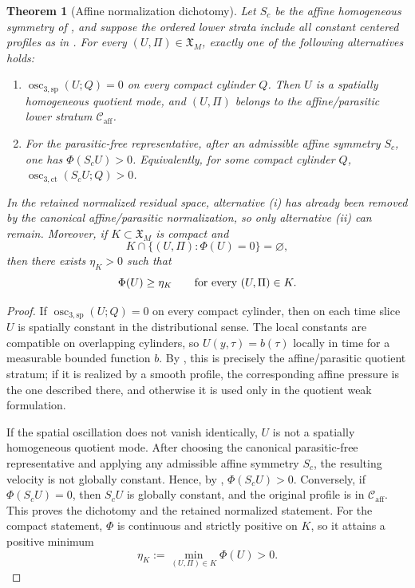 \documentclass[11pt]{amsart}
\numberwithin{equation}{section}
\theoremstyle{plain}
\newtheorem{theorem}{Theorem}[section]
\theoremstyle{definition}
\theoremstyle{remark}
\newcommand{\Caff}{\mathcal C_{\mathrm{aff}}}
\newcommand{\oscsp}{\operatorname{osc}_{3,\mathrm{sp}}}
\newcommand{\actthree}{\operatorname{osc}_{3,\mathrm{ct}}}
\begin{document}
\begin{theorem}[Affine normalization dichotomy]
\label{thm:affine-normalization-dichotomy}
Let \(S_c\) be the affine homogeneous symmetry of
, and suppose the ordered lower strata include all
constant centered profiles as in .
For every \((U,\Pi)\in\mathfrak X_M\), exactly one of the following alternatives
holds:
\begin{enumerate}[label=\textup{(\roman*)}]
   \item \(\oscsp(U;Q)=0\) on every compact cylinder \(Q\).  Then \(U\) is a
   spatially homogeneous quotient mode, and \((U,\Pi)\) belongs to the
   affine/parasitic lower stratum \(\Caff\).
   \item For the parasitic-free representative, after an admissible affine
   symmetry \(S_c\), one has \(\Phi(S_cU)>0\).  Equivalently, for some compact
   cylinder \(Q\), \(\actthree(S_cU;Q)>0\).
\end{enumerate}
In the retained normalized residual space, alternative \textup{(i)} has already
been removed by the canonical affine/parasitic normalization, so only
alternative \textup{(ii)} can remain.
Moreover, if \(K\subset\mathfrak X_M\) is compact and
\[
   K\cap\{(U,\Pi):\Phi(U)=0\}=\varnothing ,
\]
then there exists \(\eta_K>0\) such that
\[
   \Phi(U)\ge\eta_K
   \qquad\hbox{for every }(U,\Pi)\in K .
\]
\end{theorem}

\begin{proof}
If \(\oscsp(U;Q)=0\) on every compact cylinder, then on each time slice \(U\) is
spatially constant in the distributional sense.  The local constants are
compatible on overlapping cylinders, so \(U(y,\tau)=b(\tau)\) locally in time
for a measurable bounded function \(b\).  By
, this is precisely the
affine/parasitic quotient stratum; if it is realized by a smooth profile, the
corresponding affine pressure is the one described there, and otherwise it is
used only in the quotient weak formulation.

If the spatial oscillation does not vanish identically, \(U\) is not a
spatially homogeneous quotient mode.  After choosing the canonical
parasitic-free representative and applying any admissible affine symmetry
\(S_c\), the resulting velocity is not globally constant.  Hence, by
, \(\Phi(S_cU)>0\).  Conversely,
if \(\Phi(S_cU)=0\), then \(S_cU\) is globally constant, and the original
profile is in \(\Caff\).  This proves the dichotomy and the retained normalized
statement.  For the compact statement, \(\Phi\) is continuous and
strictly positive on \(K\), so it attains a positive minimum
\[
   \eta_K:=\min_{(U,\Pi)\in K}\Phi(U)>0 .
\]
\end{proof}
\end{document}
